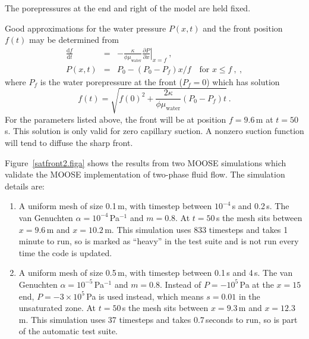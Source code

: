\documentclass[]{scrreprt}
\begin{document}
The porepressures at the end and right of the model are held fixed.

Good approximations for the water pressure $P(x,t)$
and the front position $f(t)$ may be determined from
\begin{eqnarray}
\frac{{\mathrm d} f}{{\mathrm d} t} & = & -\frac{\kappa}{\phi\mu_{\mathrm{water}}}
\left.\frac{\partial  P}{\partial x}\right|_{x = f} \ , \nonumber \\
P(x,t) & = & P_{0} - (P_{0}-P_{f})x/f \ \ \ \mbox{ for } x\leq f  \ ,
\ ,
\label{eqn.predicted.bl2.posn.eqna}
\end{eqnarray}
where $P_{f}$ is the water porepressure at the front ($P_{f}=0$)
which has solution
\begin{equation}
f(t) = \sqrt{f(0)^{2} + \frac{2\kappa}{\phi\mu_{\mathrm{water}}}(P_{0}-P_{f})t} \ .
\end{equation}
For the parameters listed above, the front will be at position
$f=9.6$\,m at $t=50$\,s.  This solution is only valid for zero
capillary suction.  A nonzero suction function will tend to diffuse
the sharp front.

Figure~\ref{satfront2.figa} shows the results from two MOOSE
simulations which validate the MOOSE implementation of two-phase fluid
flow.  The simulation details are:
\begin{enumerate}
\item A uniform mesh of size 0.1\,m, with timestep between
  $10^{-4}$\,s and 0.2\,s.  The van Genuchten
  $\alpha=10^{-4}$\,Pa$^{-1}$ and $m=0.8$.  At $t=50$\,s the mesh sits
  between $x=9.6$\,m and $x=10.2$\,m.  This simulation uses 833
  timesteps and takes 1\,minute
  to run, so is marked as ``heavy'' in the test suite and is not run
  every time the code is updated.
\item A uniform mesh of size 0.5\,m, with timestep between 0.1\,s and
  4\,s.  The van Genuchten 
  $\alpha=10^{-5}$\,Pa$^{-1}$ and $m=0.8$.  Instead of $P=-10^{5}$\,Pa
  at the $x=15$ end, $P=-3\times 10^{5}$\,Pa is used instead, which
  means $s=0.01$ in the unsaturated zone.  At $t=50$\,s the mesh sits
  between $x=9.3$\,m and $x=12.3$\,m.  This simulation uses 37
  timesteps and takes 0.7\,seconds to run, so is part of the automatic
  test suite.
\end{enumerate}
\end{document}
